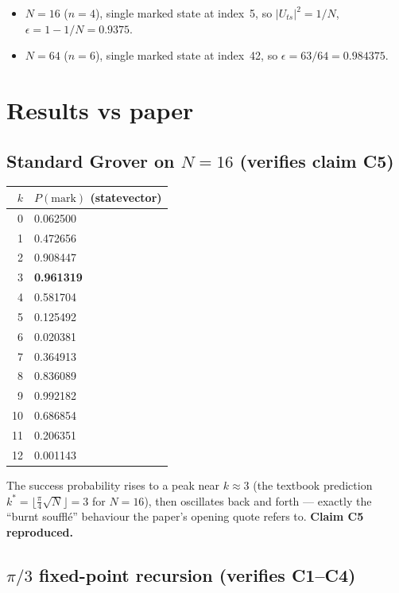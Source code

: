 \documentclass[11pt]{article}
\begin{document}
\begin{itemize}
  \item $N=16$ ($n=4$), single marked state at index~5,
        so $|U_{ts}|^{2} = 1/N$, $\epsilon = 1 - 1/N = 0.9375$.
  \item $N=64$ ($n=6$), single marked state at index~42, so
        $\epsilon = 63/64 = 0.984375$.
\end{itemize}

\section{Results vs paper}

\subsection{Standard Grover on $N=16$ (verifies claim C5)}

\begin{tabular}{rl}
\toprule
$k$ & $P(\mathrm{mark})$ (statevector) \\
\midrule
 0 & 0.062500 \\
 1 & 0.472656 \\
 2 & 0.908447 \\
 3 & \textbf{0.961319} \\
 4 & 0.581704 \\
 5 & 0.125492 \\
 6 & 0.020381 \\
 7 & 0.364913 \\
 8 & 0.836089 \\
 9 & 0.992182 \\
10 & 0.686854 \\
11 & 0.206351 \\
12 & 0.001143 \\
\bottomrule
\end{tabular}

The success probability rises to a peak near $k \approx 3$
(the textbook prediction $k^{*} = \lfloor \frac{\pi}{4}\sqrt{N} \rfloor
= 3$ for $N=16$), then oscillates back and forth --- exactly the
``burnt souffl\'e'' behaviour the paper's opening quote refers to.
\textbf{Claim C5 reproduced.}

\subsection{$\pi/3$ fixed-point recursion (verifies C1--C4)}
\end{document}
